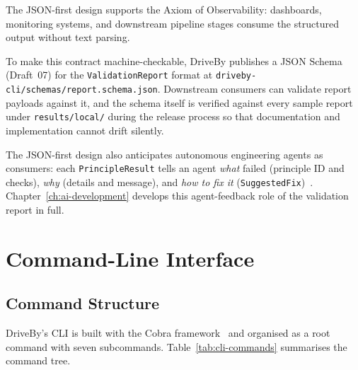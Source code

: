 The JSON-first design supports the Axiom of Observability: dashboards, monitoring systems, and downstream pipeline stages consume the structured output without text parsing.

To make this contract machine-checkable, DriveBy publishes a JSON Schema (Draft~07) for the \texttt{ValidationReport} format at \texttt{driveby-cli/schemas/report.\allowbreak schema.\allowbreak json}. Downstream consumers can validate report payloads against it, and the schema itself is verified against every sample report under \texttt{results/local/} during the release process so that documentation and implementation cannot drift silently.

The JSON-first design also anticipates autonomous engineering agents as consumers: each \texttt{PrincipleResult} tells an agent \textit{what} failed (principle ID and checks), \textit{why} (details and message), and \textit{how to fix it} (\texttt{SuggestedFix})~\cite{swe-agent}. Chapter~\ref{ch:ai-development} develops this agent-feedback role of the validation report in full.

\section{Command-Line Interface}
\label{sec:cli}

\subsection{Command Structure}
\label{subsec:command-structure}

DriveBy's CLI is built with the Cobra framework~\cite{cobra} and organised as a root command with seven subcommands. Table~\ref{tab:cli-commands} summarises the command tree.

